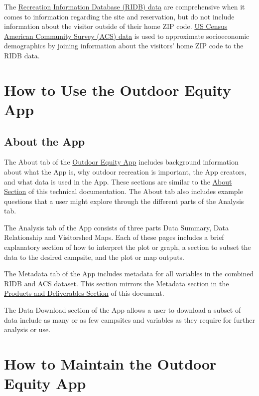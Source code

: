 \documentclass[
]{book}
\begin{document}
The \href{https://ridb.recreation.gov/landing}{Recreation Information Database (RIDB) data} are comprehensive when it comes to information regarding the site and reservation, but do not include information about the visitor outside of their home ZIP code. \href{https://www.census.gov/programs-surveys/acs/data.html}{US Census American Community Survey (ACS) data} is used to approximate socioeconomic demographics by joining information about the visitors' home ZIP code to the RIDB data.

\hypertarget{how-to-use-the-outdoor-equity-app}{%
\section{How to Use the Outdoor Equity App}\label{how-to-use-the-outdoor-equity-app}}

\hypertarget{about-the-app}{%
\subsection{About the App}\label{about-the-app}}

The About tab of the \href{https://shinyapps.bren.ucsb.edu/oe_app/}{Outdoor Equity App} includes background information about what the App is, why outdoor recreation is important, the App creators, and what data is used in the App. These sections are similar to the \protect\hyperlink{about}{About Section} of this technical documentation. The About tab also includes example questions that a user might explore through the different parts of the Analysis tab.

The Analysis tab of the App consists of three parts Data Summary, Data Relationship and Visitorshed Maps. Each of these pages includes a brief explanatory section of how to interpret the plot or graph, a section to subset the data to the desired campsite, and the plot or map outputs.

The Metadata tab of the App includes metadata for all variables in the combined RIDB and ACS dataset. This section mirrors the Metadata section in the \protect\hyperlink{products-and-deliverables}{Products and Deliverables Section} of this document.

The Data Download section of the App allows a user to download a subset of data include as many or as few campsites and variables as they require for further analysis or use.

\hypertarget{how-to-maintain-the-outdoor-equity-app}{%
\section{How to Maintain the Outdoor Equity App}\label{how-to-maintain-the-outdoor-equity-app}}
\end{document}
